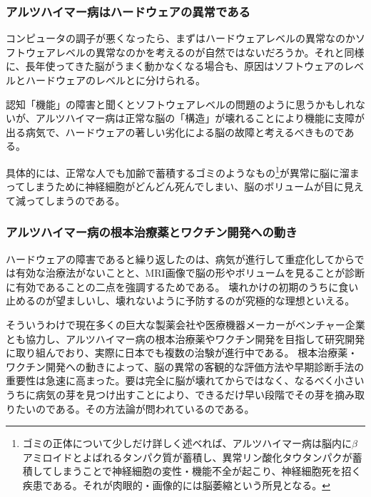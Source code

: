 \subsubsection{アルツハイマー病はハードウェアの異常である}
コンピュータの調子が悪くなったら、まずはハードウェアレベルの異常なのかソフトウェアレベルの異常なのかを考えるのが自然ではないだろうか。それと同様に、長年使ってきた脳がうまく動かなくなる場合も、原因はソフトウェアのレベルとハードウェアのレベルとに分けられる。

認知「機能」の障害と聞くとソフトウェアレベルの問題のように思うかもしれないが、アルツハイマー病は正常な脳の「構造」が壊れることにより機能に支障が出る病気で、ハードウェアの著しい劣化による脳の故障と考えるべきものである。

具体的には、正常な人でも加齢で蓄積するゴミのようなもの\footnote{ゴミの正体について少しだけ詳しく述べれば、アルツハイマー病は脳内に$\beta$アミロイドとよばれるタンパク質が蓄積し、異常リン酸化タウタンパクが蓄積してしまうことで神経細胞の変性・機能不全が起こり、神経細胞死を招く疾患である。それが肉眼的・画像的には脳萎縮という所見となる。}が異常に脳に溜まってしまうために神経細胞がどんどん死んでしまい、脳のボリュームが目に見えて減ってしまうのである。

\subsubsection{アルツハイマー病の根本治療薬とワクチン開発への動き}
ハードウェアの障害であると繰り返したのは、病気が進行して重症化してからでは有効な治療法がないことと、MRI画像で脳の形やボリュームを見ることが診断に有効であることの二点を強調するためである。
壊れかけの初期のうちに食い止めるのが望ましいし、壊れないように予防するのが究極的な理想といえる。

そういうわけで現在多くの巨大な製薬会社や医療機器メーカーがベンチャー企業とも協力し、アルツハイマー病の根本治療薬やワクチン開発を目指して研究開発に取り組んでおり、実際に日本でも複数の治験が進行中である。
根本治療薬・ワクチン開発への動きによって、脳の異常の客観的な評価方法や早期診断手法の重要性は急速に高まった。要は完全に脳が壊れてからではなく、なるべく小さいうちに病気の芽を見つけ出すことにより、できるだけ早い段階でその芽を摘み取りたいのである。その方法論が問われているのである。
